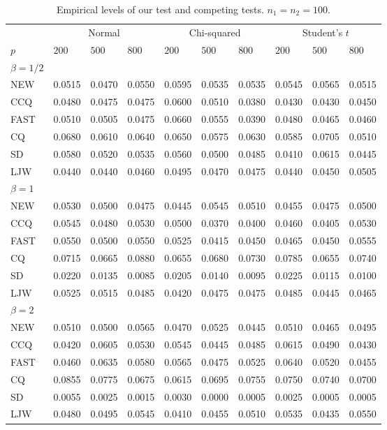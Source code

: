 \documentclass[3p]{elsarticle}
\theoremstyle{plain}
\theoremstyle{definition}
\theoremstyle{remark}
\begin{document}
\begin{table}[ht]
\caption{Empirical levels of our test and competing tests. $n_1=n_2=100$.} 
\label{hahaha2}
\vspace{3mm}
\centering
\begin{tabular}{llllllllll}
\toprule
    &   \multicolumn{3}{c}{Normal} & \multicolumn{3}{c}{Chi-squared}& \multicolumn{3}{c}{Student's $t$}  \\
    \cmidrule(r){2-4}
\cmidrule(r){5-7}
\cmidrule(r){8-10}
    $p$ & $200$ &  $500$ & $800$ & $200$  & $500$ & $800$ & $200$ & $500$ & $800$ \\ 
\midrule
    $\beta=1/2$\\
NEW & 0.0515 & 0.0470 & 0.0550 & 0.0595 & 0.0535 & 0.0535 & 0.0545 & 0.0565 & 0.0515 \\ 
CCQ & 0.0480 & 0.0475 & 0.0475 & 0.0600 & 0.0510 & 0.0380 & 0.0430 & 0.0430 & 0.0450 \\ 
FAST & 0.0510 & 0.0505 & 0.0475 & 0.0660 & 0.0555 & 0.0390 & 0.0480 & 0.0465 & 0.0460 \\ 
CQ & 0.0680 & 0.0610 & 0.0640 & 0.0650 & 0.0575 & 0.0630 & 0.0585 & 0.0705 & 0.0510 \\ 
SD & 0.0580 & 0.0520 & 0.0535 & 0.0560 & 0.0500 & 0.0485 & 0.0410 & 0.0615 & 0.0445 \\ 
LJW & 0.0440 & 0.0440 & 0.0460 & 0.0495 & 0.0470 & 0.0475 & 0.0440 & 0.0450 & 0.0505 \\ 
    $\beta=1$\\
NEW & 0.0530 & 0.0500 & 0.0475 & 0.0445 & 0.0545 & 0.0510 & 0.0455 & 0.0475 & 0.0500 \\ 
CCQ & 0.0545 & 0.0480 & 0.0530 & 0.0500 & 0.0370 & 0.0400 & 0.0460 & 0.0405 & 0.0530 \\ 
FAST & 0.0550 & 0.0500 & 0.0550 & 0.0525 & 0.0415 & 0.0450 & 0.0465 & 0.0450 & 0.0555 \\ 
CQ & 0.0715 & 0.0665 & 0.0880 & 0.0655 & 0.0680 & 0.0730 & 0.0785 & 0.0655 & 0.0740 \\ 
SD & 0.0220 & 0.0135 & 0.0085 & 0.0205 & 0.0140 & 0.0095 & 0.0225 & 0.0115 & 0.0100 \\ 
LJW & 0.0525 & 0.0515 & 0.0485 & 0.0420 & 0.0475 & 0.0475 & 0.0485 & 0.0445 & 0.0465 \\ 
    $\beta=2$\\
NEW & 0.0510 & 0.0500 & 0.0565 & 0.0470 & 0.0525 & 0.0445 & 0.0510 & 0.0465 & 0.0495 \\ 
CCQ & 0.0420 & 0.0605 & 0.0530 & 0.0545 & 0.0445 & 0.0485 & 0.0615 & 0.0490 & 0.0430 \\ 
FAST & 0.0460 & 0.0635 & 0.0580 & 0.0565 & 0.0475 & 0.0525 & 0.0640 & 0.0520 & 0.0455 \\ 
CQ & 0.0855 & 0.0775 & 0.0675 & 0.0615 & 0.0695 & 0.0755 & 0.0750 & 0.0740 & 0.0700 \\ 
SD & 0.0055 & 0.0025 & 0.0015 & 0.0030 & 0.0000 & 0.0005 & 0.0025 & 0.0005 & 0.0005 \\ 
LJW & 0.0480 & 0.0495 & 0.0545 & 0.0410 & 0.0455 & 0.0510 & 0.0535 & 0.0435 & 0.0550 \\ 
\bottomrule
\end{tabular}
\end{table}
\end{document}
